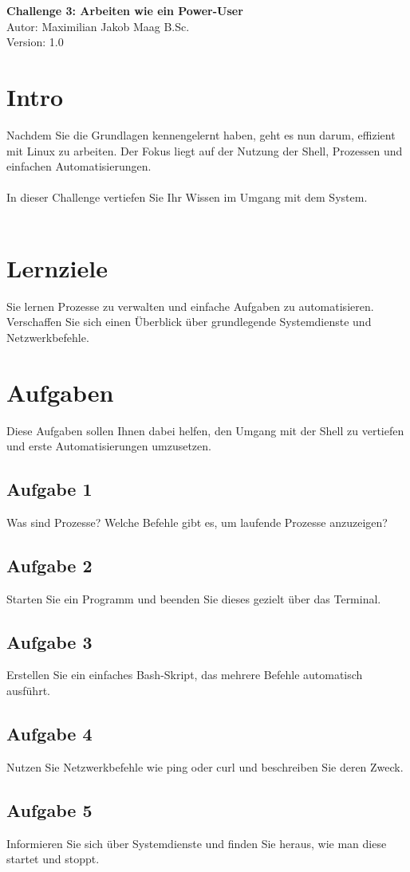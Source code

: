 \documentclass{article}
\begin{document}
    \begin{center}
        \Large \textbf{Challenge 3: Arbeiten wie ein Power-User} \\ [6pt]
        \normalsize
        Autor: Maximilian Jakob Maag B.Sc. \\
        Version: 1.0
    \end{center}

    \section{Intro}
    Nachdem Sie die Grundlagen kennengelernt haben, geht es nun darum, effizient mit Linux zu arbeiten.
    Der Fokus liegt auf der Nutzung der Shell, Prozessen und einfachen Automatisierungen. \\\\
    In dieser Challenge vertiefen Sie Ihr Wissen im Umgang mit dem System. \\\\

    \section{Lernziele}
    Sie lernen Prozesse zu verwalten und einfache Aufgaben zu automatisieren.
    Verschaffen Sie sich einen Überblick über grundlegende Systemdienste und Netzwerkbefehle.

    \section{Aufgaben}
    Diese Aufgaben sollen Ihnen dabei helfen, den Umgang mit der Shell zu vertiefen und erste Automatisierungen umzusetzen.

    \subsection{Aufgabe 1}
    Was sind Prozesse? Welche Befehle gibt es, um laufende Prozesse anzuzeigen?

    \subsection{Aufgabe 2}
    Starten Sie ein Programm und beenden Sie dieses gezielt über das Terminal.

    \subsection{Aufgabe 3}
    Erstellen Sie ein einfaches Bash-Skript, das mehrere Befehle automatisch ausführt.

    \subsection{Aufgabe 4}
    Nutzen Sie Netzwerkbefehle wie ping oder curl und beschreiben Sie deren Zweck.

    \subsection{Aufgabe 5}
    Informieren Sie sich über Systemdienste und finden Sie heraus, wie man diese startet und stoppt.
\end{document}
